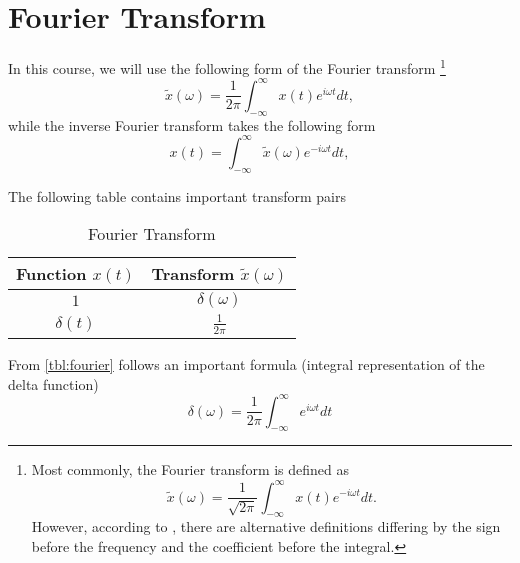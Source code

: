 \section{Fourier Transform}
\label{sec:cont_fourier}
In this course, we will use the following form of the
Fourier transform
\footnote{
Most commonly, the Fourier transform is defined as
\[
\tilde{x}\left(\omega\right) = \frac{1}{\sqrt{2 \pi}}
\int_{-\infty}^{\infty}x\left(t\right)e^{-i \omega t}dt.
\]
However, according to \cite{wiki:fourier_transform}, there are
alternative definitions differing by the sign before the frequency and
the coefficient before the integral.}
\begin{equation}
\tilde{x}\left(\omega\right) = \frac{1}{2 \pi}
\int_{-\infty}^{\infty}x\left(t\right)e^{i \omega t}dt,
\label{eq:direct_fourier}
\end{equation}
while the inverse Fourier transform takes the following form
\begin{equation}
x\left(t\right) =
\int_{-\infty}^{\infty}\tilde{x}\left(\omega\right)e^{-i \omega t}dt, 
\label{eq:reverse_fourier}
\end{equation}

The following table contains important transform pairs
\begin{table}[H]
\centering
\begin{tabular}{|c|c|}
\hline
Function $x\left(t\right)$ &  Transform $\tilde{x}\left(\omega\right)$\\ \hline
$1$  & $\delta\left(\omega\right)$ \\
$\delta\left(t\right)$  & $\frac{1}{2 \pi}$  \\
\hline
\end{tabular}
\caption{Fourier Transform}
\label{tbl:fourier}
\end{table}

From \autoref{tbl:fourier} follows an important formula (integral
representation of the delta function) \cite{wiki:deltafunction}
\begin{equation}
\delta\left(\omega\right) = \frac{1}{2 \pi} \int_{-\infty}^{\infty}
e^{i \omega t} dt
\label{eq:delta_from_integral}
\end{equation}
